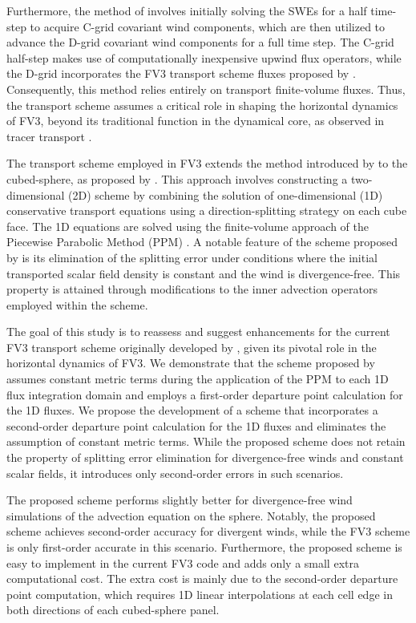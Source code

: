 \documentclass[preprint,12pt]{elsarticle}
\begin{document}
\begin{linenumbers}
Furthermore, the method of  \cite{lin:1997} involves initially solving the SWEs for a half time-step to acquire C-grid covariant wind components, 
which are then utilized to advance the D-grid covariant wind components for a full time step. 
The C-grid half-step makes use of computationally inexpensive upwind flux operators, while the D-grid incorporates the FV3 transport scheme fluxes proposed by \cite{lin:1996,putman:2007}.
Consequently, this method relies entirely on transport finite-volume fluxes. 
Thus, the transport scheme assumes a critical role in shaping the horizontal dynamics of FV3, beyond its traditional function in the dynamical core, as observed in tracer transport \cite{will:2007}.

The transport scheme employed in FV3 extends the method introduced by \cite{lin:1996} to the cubed-sphere, as proposed by \cite{putman:2007}. 
This approach involves constructing a two-dimensional (2D) scheme by combining the solution of one-dimensional (1D) conservative transport equations using a direction-splitting strategy on each cube face.
The 1D equations are solved using the finite-volume approach of the Piecewise Parabolic Method (PPM) \cite{colella:1984,carpenter:1990}. 
A notable feature of the scheme proposed by \cite{lin:1996} is its elimination of the splitting error under conditions where the initial transported scalar field density is constant and the wind is divergence-free. 
This property is attained through modifications to the inner advection operators employed within the scheme.

The goal of this study is to reassess and suggest enhancements for the current FV3 transport scheme originally developed by \cite{putman:2007}, given its pivotal role in the horizontal dynamics of FV3. 
We demonstrate that the scheme proposed by \cite{putman:2007} assumes constant metric terms during the application of the PPM to each 1D flux integration domain and employs a first-order departure point calculation for the 1D fluxes.
We propose the development of a scheme that incorporates a second-order departure point calculation for the 1D fluxes and eliminates the assumption of constant metric terms. 
While the proposed scheme does not retain the property of splitting error elimination for divergence-free winds and constant scalar fields, it introduces only second-order errors in such scenarios.

The proposed scheme performs slightly better for divergence-free wind simulations of the advection equation on the sphere.
Notably, the proposed scheme achieves second-order accuracy for divergent winds, while the FV3 scheme is only first-order accurate in this scenario.
Furthermore,  the proposed scheme is easy to implement in the current FV3 code and adds only a small extra computational cost.
The extra cost is mainly due to the second-order departure point computation, which requires 1D linear interpolations at each cell edge in both directions of each cubed-sphere panel.


\end{linenumbers}
\end{document}
